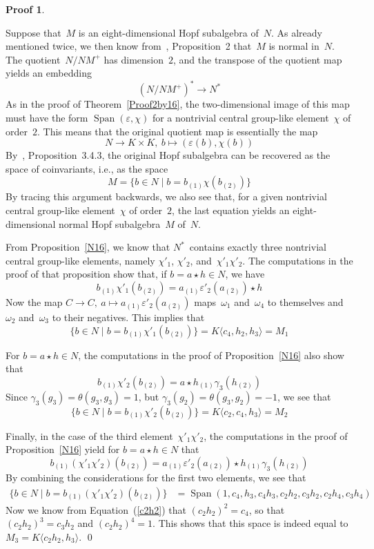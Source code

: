 \documentclass{article}
\newcounter{num}
\newenvironment{pflist}{\begin{list}{(\arabic{num})}{\usecounter{num} \leftmargin0cm \itemindent5pt}}{\end{list}}
\newcounter{num1}
\numberwithin{equation}{section}
\theoremstyle{definition}
\newtheorem*{pf}{Proof}
\theoremstyle{break}
\newcommand{\Span}{\operatorname{Span}}
\newcommand{\1}{{(1)}}
\newcommand{\2}{{(2)}}
\newcommand{\3}{{(3)}}
\begin{document}
\begin{pf}
\begin{pflist}
\item
Suppose that~$M$ is an eight-dimensional Hopf subalgebra of~$N$. As already mentioned twice, we then know from~\cite{KoMa}, Proposition~2 that~$M$ is normal in~$N$. The quotient~$N/NM^+$ has dimension~$2$, and the transpose of the quotient map yields an embedding
\[(N/NM^+)^* \to N^*\]
As in the proof of Theorem~\ref{Proof2by16}, the two-dimensional image of this map must have the form
$\Span(\varepsilon, \chi)$ for a nontrivial central group-like element~$\chi$ of order~$2$. This means that the original quotient map is essentially the map
\[N \to K \times K,~b \mapsto (\varepsilon(b), \chi(b)) \]
By~\cite{M}, Proposition~3.4.3, the original Hopf subalgebra can be recovered as the space of coinvariants, i.e., as the space
\[M = \{b \in N \mid b = b_\1 \chi(b_\2) \}\]
By tracing this argument backwards, we also see that, for a given nontrivial central group-like element~$\chi$ of order~$2$, the last equation yields an eight-dimensional normal Hopf subalgebra~$M$ of~$N$.

\item
From Proposition~\ref{N16}, we know that $N^*$~contains exactly three nontrivial central group-like elements, namely $\chi'_1$, $\chi'_2$, and~$\chi'_1 \chi'_2$. The computations in the proof of that proposition show that, if $b = a \star h \in N$, we have
\[b_\1 \chi'_1 (b_\2) = a_\1 \varepsilon'_2(a_\2) \star  h\]
Now the map $C \to C,~a \mapsto a_\1 \varepsilon'_2(a_\2)$
maps~$\omega_1$ and~$\omega_4$ to themselves and~$\omega_2$ and~$\omega_3$ to their negatives. This implies that
\[\{b \in N \mid b = b_\1 \chi'_1(b_\2) \}= K\langle c_4, h_2, h_3 \rangle = M_1\]

\item
For $b = a \star h \in N$, the computations in the proof of Proposition~\ref{N16} also show that
\[b_\1 \chi'_2 (b_\2) = a \star  h_\1 \gamma_3(h_\2) \]
Since $\gamma_3(g_3) = \theta(g_3, g_3) = 1$, but $\gamma_3(g_2) = \theta(g_3, g_2) = -1$, we see that
\[\{b \in N \mid b = b_\1 \chi'_2(b_\2) \} = K\langle c_2, c_4, h_3 \rangle = M_2\]

\item
Finally, in the case of the third element~$\chi'_1 \chi'_2$, the computations in the proof of Proposition~\ref{N16} yield for $b = a \star h \in N$ that
\[b_\1 (\chi'_1 \chi'_2)(b_\2) = a_\1 \varepsilon'_2(a_\2) \star  h_\1 \gamma_3(h_\2) \]
By combining the considerations for the first two elements, we see that
\begin{align*}
\{b \in N \mid b = b_\1 (\chi'_1 \chi'_2)(b_\2) \} &=
\Span(1, c_4, h_3, c_4 h_3, c_2 h_2, c_3 h_2, c_2 h_4, c_3 h_4)
\end{align*}
Now we know from Equation~(\ref{c2h2}) that $(c_2 h_2)^2 = c_4$, so that
$(c_2 h_2)^3 = c_3 h_2$ and $(c_2 h_2)^4 = 1$. This shows that this space is indeed equal to 
$M_3 = K\langle c_2 h_2, h_3 \rangle$.
\qed
\end{pflist}
\end{pf}
\end{document}
